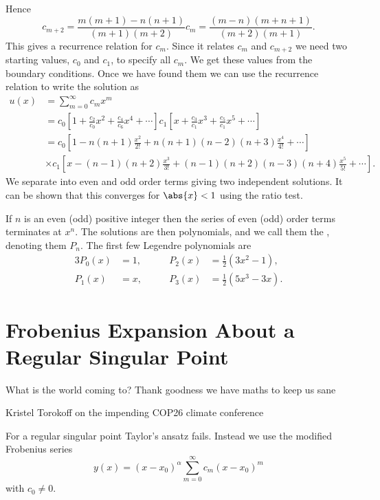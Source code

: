 \documentclass[fleqn]{NotesClass}
\begin{document}
    Hence
    \begin{equation}
        c_{m+2} = \frac{m(m + 1) - n(n + 1)}{(m + 1)(m + 2)} c_m = \frac{(m - n)(m + n + 1)}{(m + 2)(m + 1)}.
    \end{equation}
    This gives a recurrence relation for \(c_m\).
    Since it relates \(c_m\) and \(c_{m+2}\) we need two starting values, \(c_0\) and \(c_1\), to specify all \(c_m\).
    We get these values from the boundary conditions.
    Once we have found them we can use the recurrence relation to write the solution as
    \begin{align}
        u(x) &= \sum_{m=0}^{\infty} c_mx^m\\
        &= c_0\left[ 1 + \frac{c_2}{c_0}x^2 + \frac{c_4}{c_6}x^{4} + \dotsb \right] c_1\left[ x + \frac{c_3}{c_1}x^3 + \frac{c_5}{c_1}x^5 + \dotsb \right]\\
        &= c_0 \left[ 1 - n(n + 1)\frac{x^2}{2!} + n(n + 1)(n - 2)(n + 3)\frac{x^4}{4!} + \dotsb \right]\\
        &\times c_1\left[ x - (n - 1)(n + 2)\frac{x^3}{3!} + (n - 1)(n + 2)(n - 3)(n + 4)\frac{x^5}{5!} + \dotsb \right].
    \end{align}
    We separate into even and odd order terms giving two independent solutions.
    It can be shown that this converges for \(\abs{x} < 1\) using the ratio test.
    
    If \(n\) is an even (odd) positive integer then the series of even (odd) order terms terminates at \(x^{n}\).
    The solutions are then polynomials, and we call them the , denoting them \(P_n\).
    The first few Legendre polynomials are
    \begin{alignat}{3}
        P_0(x) &= 1, \qquad & P_2(x) &= \frac{1}{2}(3x^2 - 1),\\
        P_1(x) &= x, \qquad & P_3(x) &= \frac{1}{2}(5x^3 - 3x).
    \end{alignat}
    
    \section{Frobenius Expansion About a Regular Singular Point}
    \epigraph{What is the world coming to? Thank goodness we have maths to keep us sane}{Kristel Torokoff on the impending COP26 climate conference}
    For a regular singular point Taylor's ansatz fails.
    Instead we use the modified Frobenius series
    \begin{equation}
        y(x) = (x - x_0)^{\alpha} \sum_{m=0}^{\infty} c_m(x - x_0)^m
    \end{equation}
    with \(c_0 \ne 0\).
    
\end{document}
